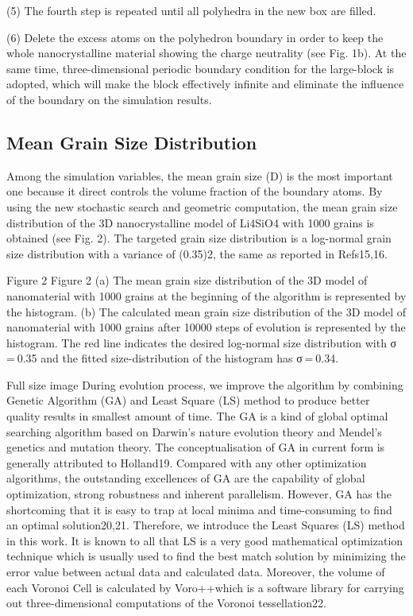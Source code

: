 \documentclass{article}
\begin{document}
(5) The fourth step is repeated until all polyhedra in the new box are filled.

(6) Delete the excess atoms on the polyhedron boundary in order to keep the whole nanocrystalline material showing the charge neutrality (see Fig. 1b). At the same time, three-dimensional periodic boundary condition for the large-block is adopted, which will make the block effectively infinite and eliminate the influence of the boundary on the simulation results.

\subsection{Mean Grain Size Distribution}

Among the simulation variables, the mean grain size (D) is the most important one because it direct controls the volume fraction of the boundary atoms. By using the new stochastic search and geometric computation, the mean grain size distribution of the 3D nanocrystalline model of Li4SiO4 with 1000 grains is obtained (see Fig. 2). The targeted grain size distribution is a log-normal grain size distribution with a variance of (0.35)2, the same as reported in Refs15,16.

Figure 2
Figure 2
(a) The mean grain size distribution of the 3D model of nanomaterial with 1000 grains at the beginning of the algorithm is represented by the histogram. (b) The calculated mean grain size distribution of the 3D model of nanomaterial with 1000 grains after 10000 steps of evolution is represented by the histogram. The red line indicates the desired log-normal size distribution with σ = 0.35 and the fitted size-distribution of the histogram has σ = 0.34.

Full size image
During evolution process, we improve the algorithm by combining Genetic Algorithm (GA) and Least Square (LS) method to produce better quality results in smallest amount of time. The GA is a kind of global optimal searching algorithm based on Darwin’s nature evolution theory and Mendel’s genetics and mutation theory. The conceptualisation of GA in current form is generally attributed to Holland19. Compared with any other optimization algorithms, the outstanding excellences of GA are the capability of global optimization, strong robustness and inherent parallelism. However, GA has the shortcoming that it is easy to trap at local minima and time-consuming to find an optimal solution20,21. Therefore, we introduce the Least Squares (LS) method in this work. It is known to all that LS is a very good mathematical optimization technique which is usually used to find the best match solution by minimizing the error value between actual data and calculated data. Moreover, the volume of each Voronoi Cell is calculated by Voro++which is a software library for carrying out three-dimensional computations of the Voronoi tessellation22.
\end{document}
